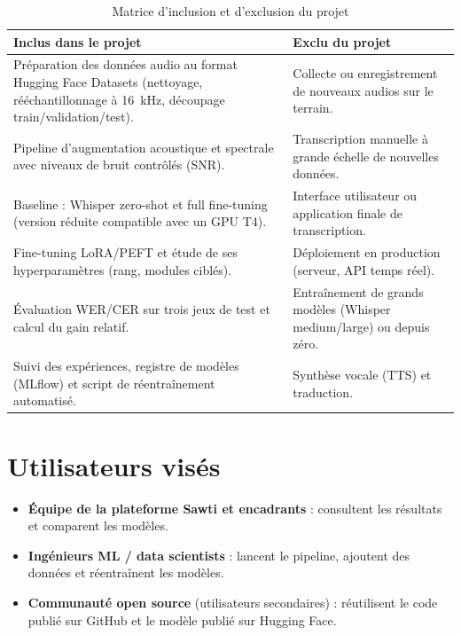 \documentclass[12pt,a4paper]{report}
\begin{document}
\begin{table}[h]
  \centering
  \small
  \begin{tabularx}{\textwidth}{XX}
    \toprule
    \textbf{Inclus dans le projet} & \textbf{Exclu du projet} \\
    \midrule
    Préparation des données audio au format Hugging Face Datasets (nettoyage,
    rééchantillonnage à 16~kHz, découpage train/validation/test).
    & Collecte ou enregistrement de nouveaux audios sur le terrain. \\
    \addlinespace
    Pipeline d'augmentation acoustique et spectrale avec niveaux de bruit
    contrôlés (SNR).
    & Transcription manuelle à grande échelle de nouvelles données. \\
    \addlinespace
    Baseline : Whisper zero-shot et full fine-tuning (version réduite compatible
    avec un GPU T4).
    & Interface utilisateur ou application finale de transcription. \\
    \addlinespace
    Fine-tuning LoRA/PEFT et étude de ses hyperparamètres (rang, modules ciblés).
    & Déploiement en production (serveur, API temps réel). \\
    \addlinespace
    Évaluation WER/CER sur trois jeux de test et calcul du gain relatif.
    & Entraînement de grands modèles (Whisper medium/large) ou depuis zéro. \\
    \addlinespace
    Suivi des expériences, registre de modèles (MLflow) et script de
    réentraînement automatisé.
    & Synthèse vocale (TTS) et traduction. \\
    \bottomrule
  \end{tabularx}
  \caption{Matrice d'inclusion et d'exclusion du projet}
  \label{tab:perimetre}
\end{table}

\section{Utilisateurs visés}
\begin{itemize}
  \item \textbf{Équipe de la plateforme Sawti et encadrants} : consultent les
        résultats et comparent les modèles.
  \item \textbf{Ingénieurs ML / data scientists} : lancent le pipeline, ajoutent
        des données et réentraînent les modèles.
  \item \textbf{Communauté open source} (utilisateurs secondaires) : réutilisent le
        code publié sur GitHub et le modèle publié sur Hugging Face.
\end{itemize}
\end{document}
